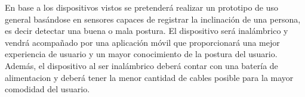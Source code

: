 En base a los dispositivos vistos se pretenderá realizar un prototipo de uso general basándose en sensores capaces de registrar la inclinación de una persona, es decir detectar una buena o mala postura. El dispositivo será inalámbrico y vendrá acompañado por una aplicación móvil que proporcionará una mejor experiencia de usuario y un mayor conocimiento de la postura del usuario. Además, el dispositivo al ser inalámbrico deberá contar con una batería de alimentacion y deberá tener la menor cantidad de cables posible para la mayor comodidad del usuario.
